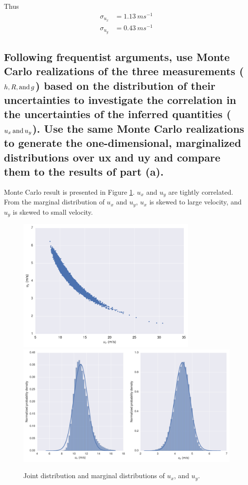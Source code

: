 \documentclass[paper=letter, fontsize=11pt]{scrartcl} %
\begin{document}
Thus
\begin{align}
  \sigma_{u_{x}} &= \SI{1.13}{ms^{-1}}\\
  \sigma_{u_{y}} &=\SI{0.43}{ms^{-1}}
\end{align}

\subsection{Following frequentist arguments, use Monte Carlo
  realizations of the three measurements ($h, R, \hbox{and}\,g$) based
  on the distribution of their uncertainties to investigate the
  correlation in the uncertainties of the inferred quantities
  ($u_{x}\, \hbox{and}\, u_{y}$). Use the same Monte Carlo realizations to
  generate the one-dimensional, marginalized distributions over ux and
  uy and compare them to the results of part (a).}

\newcommand{\ux}{\ensuremath{u_x}}
\newcommand{\uy}{\ensuremath{u_y}}
Monte Carlo result is presented in Figure \ref{fig:2b}. $u_{x}$ and
$u_{y}$ are tightly correlated. From the marginal distribution of
$u_{x}$ and $u_{y}$, \ux{} is skewed to large velocity, and \uy{} is
skewed to small velocity.
\begin{figure}
  \centering
  \includegraphics[width=0.8\textwidth]{MC_joint}\\
  \includegraphics[width=\textwidth]{MC_MarginDist}
  \caption{Joint distribution and marginal distributions of $u_{x}$,
    and $u_{y}$.}
  \label{fig:2b}
\end{figure}
\end{document}
